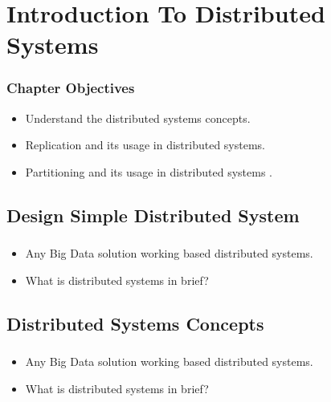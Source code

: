 \section{Introduction To Distributed Systems}


\begin{frame}
\frametitle{Chapter Objectives}

\begin{itemize}
	\item<1-> Understand the distributed systems concepts. \pause
	\item<2-> Replication and its usage in distributed systems.
	\item<3-> Partitioning and its usage in distributed systems . \pause

\end{itemize}

\end{frame}


\subsection{Design Simple Distributed System}
\begin{frame}
	\frametitle{\subsecname}
	\begin{itemize} 
		\item Any Big Data solution working based distributed systems.
		\item What is distributed systems in brief?
	\end{itemize}
\end{frame}



\subsection{Distributed Systems Concepts}
\begin{frame}
\frametitle{\subsecname}
\begin{itemize} 
	\item Any Big Data solution working based distributed systems.
	\item What is distributed systems in brief?
\end{itemize}
\end{frame}


